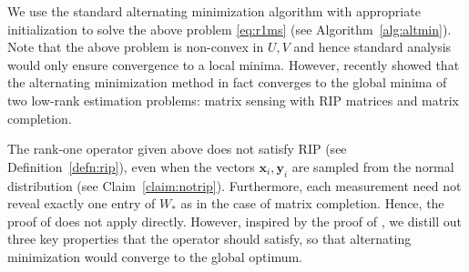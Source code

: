 \documentclass[11pt]{article}
\newcommand{\tp}[1]{{#1}^{T}}
\newcommand{\So}{\Sigma_*}
\newcommand{\Uo}{U_*}
\newcommand{\Wo}{W_*}
\newcommand{\x}{\bm{x}}
\newcommand{\y}{\bm{y}}
\begin{document}
We use the standard alternating minimization algorithm with appropriate initialization to solve the above problem \eqref{eq:r1ms} (see Algorithm~\ref{alg:altmin}). Note that the above problem is non-convex in $U, V$ and hence standard analysis would only ensure convergence to a local minima. However, \cite{JainNS13} recently showed that the alternating minimization method in fact converges to the global minima of two low-rank estimation problems: matrix sensing with RIP matrices and matrix completion. 

The rank-one operator given above does not satisfy RIP (see Definition~\ref{defn:rip}), even when the vectors $\x_i, \y_i$ are sampled from the normal distribution (see Claim~\ref{claim:notrip}). Furthermore, each measurement need not reveal exactly one entry of $\Wo$ as in the case of matrix completion. Hence, the proof of \cite{JainNS13} does not apply directly. However, inspired by the proof of \cite{JainNS13}, we distill out three key properties that the operator should satisfy, so that alternating minimization would  converge to the global optimum. %
\end{document}
